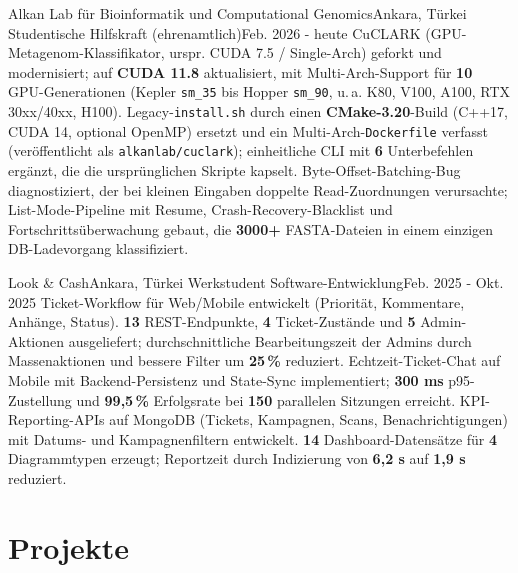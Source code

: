     \resumeSubheading
  {Alkan Lab für Bioinformatik und Computational Genomics}{Ankara, Türkei}
  {Studentische Hilfskraft (ehrenamtlich)}{Feb. 2026 - heute}
  \resumeItemListStart
        {CuCLARK (GPU-Metagenom-Klassifikator, urspr. CUDA 7.5 / Single-Arch) geforkt und modernisiert; auf \textbf{CUDA 11.8} aktualisiert, mit Multi-Arch-Support für \textbf{10} GPU-Generationen (Kepler \texttt{sm\_35} bis Hopper \texttt{sm\_90}, u.\,a. K80, V100, A100, RTX 30xx/40xx, H100).}
        {Legacy-\texttt{install.sh} durch einen \textbf{CMake-3.20}-Build (C++17, CUDA 14, optional OpenMP) ersetzt und ein Multi-Arch-\texttt{Dockerfile} verfasst (veröffentlicht als \texttt{alkanlab/cuclark}); einheitliche CLI mit \textbf{6} Unterbefehlen ergänzt, die die ursprünglichen Skripte kapselt.}
        {Byte-Offset-Batching-Bug diagnostiziert, der bei kleinen Eingaben doppelte Read-Zuordnungen verursachte; List-Mode-Pipeline mit Resume, Crash-Recovery-Blacklist und Fortschrittsüberwachung gebaut, die \textbf{3000+} FASTA-Dateien in einem einzigen DB-Ladevorgang klassifiziert.}
    \resumeItemListEnd

    \resumeSubheading
  {Look \& Cash}{Ankara, Türkei}
  {Werkstudent Software-Entwicklung}{Feb. 2025 - Okt. 2025}
  \resumeItemListStart
        {Ticket-Workflow für Web/Mobile entwickelt (Priorität, Kommentare, Anhänge, Status). \textbf{13} REST-Endpunkte, \textbf{4} Ticket-Zustände und \textbf{5} Admin-Aktionen ausgeliefert; durchschnittliche Bearbeitungszeit der Admins durch Massenaktionen und bessere Filter um \textbf{25\,\%} reduziert.}
        {Echtzeit-Ticket-Chat auf Mobile mit Backend-Persistenz und State-Sync implementiert; \textbf{300 ms} p95-Zustellung und \textbf{99,5\,\%} Erfolgsrate bei \textbf{150} parallelen Sitzungen erreicht.}
        {KPI-Reporting-APIs auf MongoDB (Tickets, Kampagnen, Scans, Benachrichtigungen) mit Datums- und Kampagnenfiltern entwickelt. \textbf{14} Dashboard-Datensätze für \textbf{4} Diagrammtypen erzeugt; Reportzeit durch Indizierung von \textbf{6,2 s} auf \textbf{1,9 s} reduziert.}
    \resumeItemListEnd

  \resumeSubHeadingListEnd


\section{Projekte}
  \resumeSubHeadingListStart

